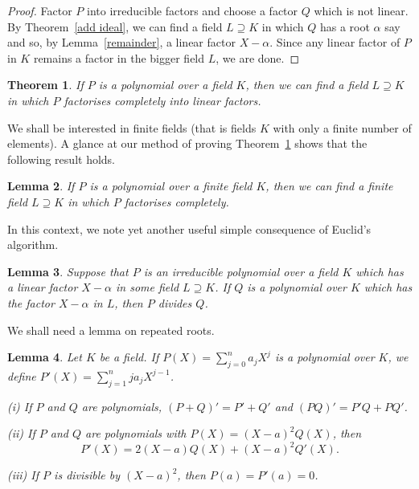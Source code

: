 \documentclass[12pt,a4paper]{article}
\theoremstyle{plain}
\newtheorem{theorem}{Theorem}[section]
\newtheorem{lemma}[theorem]{Lemma}
\theoremstyle{definition}
\begin{document}
    \begin{proof}
        Factor $P$ into irreducible factors
        and choose a factor $Q$ which is not linear.
        By Theorem~\ref{add ideal}, we can find a field $L\supseteq K$
        in which $Q$ has a root $\alpha$ say
        and so, by Lemma~\ref{remainder},
        a linear factor $X-\alpha$. Since any linear factor of
        $P$ in $K$ remains a factor in the bigger field $L$,
        we are done.
    \end{proof}
    \begin{theorem}
        \label{splits one}
        If $P$ is a polynomial over a field $K$,
        then we can find a field $L\supseteq K$
        in which $P$ factorises completely
        into linear factors.
    \end{theorem}

    We shall be interested in finite fields (that is
    fields $K$ with only a finite number of elements).
    A glance at our method of proving Theorem~\ref{splits one}
    shows that the following result holds.
    \begin{lemma}
        \label{splits two}
        If $P$ is a polynomial over a finite field $K$,
        then we can find a finite field $L\supseteq K$
        in which $P$ factorises completely.
    \end{lemma}

    In this context, we note yet another useful
    simple consequence of Euclid's algorithm.
    \begin{lemma}
        Suppose that
        $P$ is an irreducible
        polynomial over a field $K$
        which has a linear factor $X-\alpha$
        in some field $L\supseteq K$.
        If $Q$ is a polynomial over $K$ which
        has the factor $X-\alpha$ in $L$,
        then $P$ divides $Q$.
    \end{lemma}

    We shall need a lemma on repeated roots.
    \begin{lemma}
        Let $K$ be a field. If
        $P(X)=\sum_{j=0}^{n}a_{j}X^{j}$ is a polynomial
        over $K$, we define $P'(X)=\sum_{j=1}^{n}ja_{j}X^{j-1}$.

        (i) If $P$ and $Q$ are polynomials, $(P+Q)'=P'+Q'$
        and $(PQ)'=P'Q+PQ'$.

        (ii) If $P$ and $Q$ are polynomials with
        $P(X)=(X-a)^{2}Q(X)$, then
        \[P'(X)=2(X-a)Q(X)+(X-a)^{2}Q'(X).\]

        (iii) If $P$ is divisible by $(X-a)^{2}$, then $P(a)=P'(a)=0$.
    \end{lemma}
\end{document}
